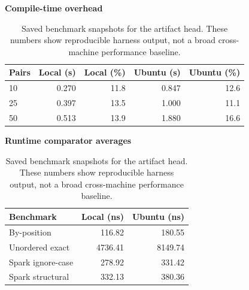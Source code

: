 \begin{table}[t]
  \caption{Saved benchmark snapshots for the artifact head. These numbers show reproducible harness output, not a broad cross-machine performance baseline.}
  \label{tab:benchmarks}
  \centering
  \scriptsize
  \textbf{Compile-time overhead}

  \begin{tabular}{lrrrr}
    \toprule
    Pairs & Local (s) & Local (\%) & Ubuntu (s) & Ubuntu (\%) \\
    \midrule
    10 & 0.270 & 11.8 & 0.847 & 12.6 \\
    25 & 0.397 & 13.5 & 1.000 & 11.1 \\
    50 & 0.513 & 13.9 & 1.880 & 16.6 \\
    \bottomrule
  \end{tabular}

  \vspace{0.6em}
  \textbf{Runtime comparator averages}

  \begin{tabular}{lrr}
    \toprule
    Benchmark & Local (ns) & Ubuntu (ns) \\
    \midrule
    By-position & 116.82 & 180.55 \\
    Unordered exact & 4736.41 & 8149.74 \\
    Spark ignore-case & 278.92 & 331.42 \\
    Spark structural & 332.13 & 380.36 \\
    \bottomrule
  \end{tabular}
\end{table}
